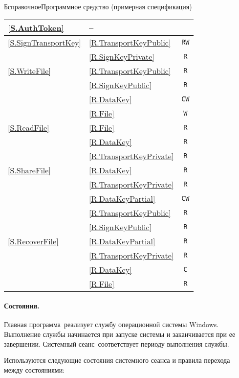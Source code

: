 \begin{appendix}{Б}{справочное}{Программное средство \CryptoDisk 
(примерная спецификация)}
\begin{table}[p]
\begin{tabular}{|p{5cm}|p{8.7cm}|c|}
\hline
\ref{S.AuthToken}    & --& \\
\hline
\ref{S.SignTransportKey} & \ref{R.TransportKeyPublic}\up{U} & \texttt{RW}\\
                          & \ref{R.SignKeyPrivate} & \texttt{R}\\
\hline
\ref{S.WriteFile} & \ref{R.TransportKeyPublic}\up{H} & \texttt{R}\\
                     & \ref{R.SignKeyPublic}\up{A} & \texttt{R}\\
                     & \ref{R.DataKey}\up{H} & \texttt{CW}\\
                     & \ref{R.File}\up{H} & \texttt{W}\\
\hline
\ref{S.ReadFile}  & \ref{R.File}& \texttt{R}\\
                     & \ref{R.DataKey}& \texttt{R}\\
                     & \ref{R.TransportKeyPrivate}& \texttt{R}\\
\hline
\ref{S.ShareFile} & \ref{R.DataKey}& \texttt{R}\\
                     & \ref{R.TransportKeyPrivate} & \texttt{R}\\
                     & \ref{R.DataKeyPartial}\up{UA} & \texttt{CW}\\
                     & \ref{R.TransportKeyPublic}\up{UA} & \texttt{R}\\
                     & \ref{R.SignKeyPublic}\up{A} & \texttt{R}\\
\hline
\ref{S.RecoverFile} & \ref{R.DataKeyPartial} & \texttt{R}\\
                     & \ref{R.TransportKeyPrivate} & \texttt{R}\\
                     & \ref{R.DataKey}\up{H} & \texttt{C}\\
                     & \ref{R.File}\up{H} & \texttt{R}\\
\hline
\end{tabular}
\end{table}

\paragraph*{Состояния.} 
Главная программа~\CryptoDisk реализует службу операционной системы Windows.
Выполнение службы начинается при запуске системы и заканчивается при ее завершении.
Системный сеанс~\CryptoDisk соответствует периоду выполнения службы.

Используются следующие состояния системного сеанса 
и правила перехода между состояниями:


\end{appendix}
